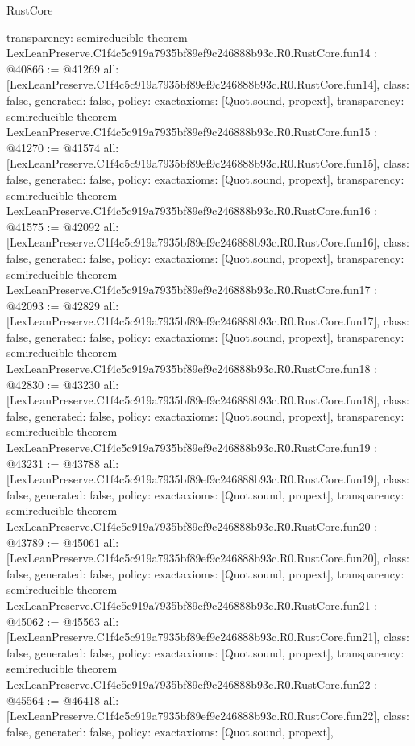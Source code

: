 \begin{lexlean}{RustCore}
\begin{coremodule}
{  transparency: semireducible
}
theorem LexLeanPreserve.C1f4c5c919a7935bf89ef9c246888b93c.R0.RustCore.fun14 : @40866 := @41269 {
  all: [LexLeanPreserve.C1f4c5c919a7935bf89ef9c246888b93c.R0.RustCore.fun14],
  class: false,
  generated: false,
  policy: exact{axioms: [Quot.sound, propext]},
  transparency: semireducible
}
theorem LexLeanPreserve.C1f4c5c919a7935bf89ef9c246888b93c.R0.RustCore.fun15 : @41270 := @41574 {
  all: [LexLeanPreserve.C1f4c5c919a7935bf89ef9c246888b93c.R0.RustCore.fun15],
  class: false,
  generated: false,
  policy: exact{axioms: [Quot.sound, propext]},
  transparency: semireducible
}
theorem LexLeanPreserve.C1f4c5c919a7935bf89ef9c246888b93c.R0.RustCore.fun16 : @41575 := @42092 {
  all: [LexLeanPreserve.C1f4c5c919a7935bf89ef9c246888b93c.R0.RustCore.fun16],
  class: false,
  generated: false,
  policy: exact{axioms: [Quot.sound, propext]},
  transparency: semireducible
}
theorem LexLeanPreserve.C1f4c5c919a7935bf89ef9c246888b93c.R0.RustCore.fun17 : @42093 := @42829 {
  all: [LexLeanPreserve.C1f4c5c919a7935bf89ef9c246888b93c.R0.RustCore.fun17],
  class: false,
  generated: false,
  policy: exact{axioms: [Quot.sound, propext]},
  transparency: semireducible
}
theorem LexLeanPreserve.C1f4c5c919a7935bf89ef9c246888b93c.R0.RustCore.fun18 : @42830 := @43230 {
  all: [LexLeanPreserve.C1f4c5c919a7935bf89ef9c246888b93c.R0.RustCore.fun18],
  class: false,
  generated: false,
  policy: exact{axioms: [Quot.sound, propext]},
  transparency: semireducible
}
theorem LexLeanPreserve.C1f4c5c919a7935bf89ef9c246888b93c.R0.RustCore.fun19 : @43231 := @43788 {
  all: [LexLeanPreserve.C1f4c5c919a7935bf89ef9c246888b93c.R0.RustCore.fun19],
  class: false,
  generated: false,
  policy: exact{axioms: [Quot.sound, propext]},
  transparency: semireducible
}
theorem LexLeanPreserve.C1f4c5c919a7935bf89ef9c246888b93c.R0.RustCore.fun20 : @43789 := @45061 {
  all: [LexLeanPreserve.C1f4c5c919a7935bf89ef9c246888b93c.R0.RustCore.fun20],
  class: false,
  generated: false,
  policy: exact{axioms: [Quot.sound, propext]},
  transparency: semireducible
}
theorem LexLeanPreserve.C1f4c5c919a7935bf89ef9c246888b93c.R0.RustCore.fun21 : @45062 := @45563 {
  all: [LexLeanPreserve.C1f4c5c919a7935bf89ef9c246888b93c.R0.RustCore.fun21],
  class: false,
  generated: false,
  policy: exact{axioms: [Quot.sound, propext]},
  transparency: semireducible
}
theorem LexLeanPreserve.C1f4c5c919a7935bf89ef9c246888b93c.R0.RustCore.fun22 : @45564 := @46418 {
  all: [LexLeanPreserve.C1f4c5c919a7935bf89ef9c246888b93c.R0.RustCore.fun22],
  class: false,
  generated: false,
  policy: exact{axioms: [Quot.sound, propext]},
}
\end{coremodule}
\end{lexlean}
